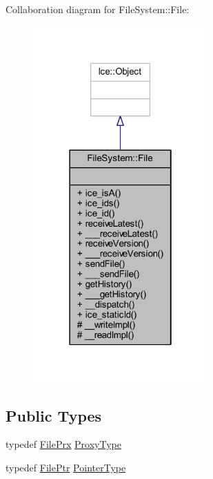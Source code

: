 Collaboration diagram for File\+System\+:\+:File\+:
\nopagebreak
\begin{figure}[H]
\begin{center}
\leavevmode
\includegraphics[width=190pt]{class_file_system_1_1_file__coll__graph}
\end{center}
\end{figure}
\subsection*{Public Types}
\begin{DoxyCompactItemize}
\item 
typedef \hyperlink{namespace_file_system_a2cca5b42d5ab231d91dd889d4d74218c}{File\+Prx} \hyperlink{class_file_system_1_1_file_a2dc305348e01c17ad9736a7abcbec36e}{Proxy\+Type}
\item 
typedef \hyperlink{namespace_file_system_a322304ec4ae6dc6308f79d49662764bb}{File\+Ptr} \hyperlink{class_file_system_1_1_file_a51b2a288a025efc05fb07e0dfb29f06f}{Pointer\+Type}
\end{DoxyCompactItemize}
